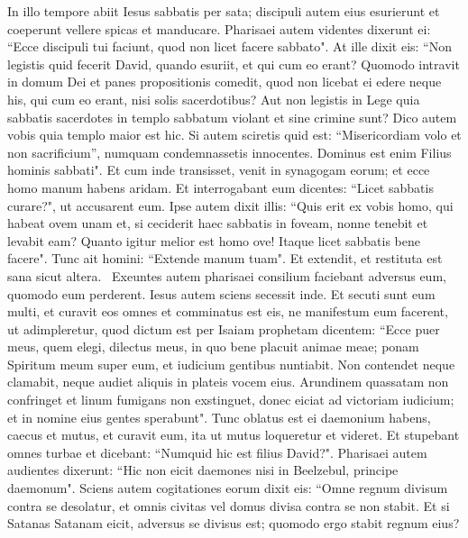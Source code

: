 \begin{biblechapter}  
\verse In illo tempore abiit Iesus sabbatis per sata; discipuli autem eius esurierunt et coeperunt vellere spicas et manducare. 
\verse Pharisaei autem videntes dixerunt ei: “Ecce discipuli tui faciunt, quod non licet facere sabbato". 
\verse At ille dixit eis: “Non legistis quid fecerit David, quando esuriit, et qui cum eo erant? 
\verse Quomodo intravit in domum Dei et panes propositionis comedit, quod non licebat ei edere neque his, qui cum eo erant, nisi solis sacerdotibus? 
\verse Aut non legistis in Lege quia sabbatis sacerdotes in templo sabbatum violant et sine crimine sunt? 
\verse Dico autem vobis quia templo maior est hic.  
\verse Si autem sciretis quid est: “Misericordiam volo et non sacrificium”, numquam condemnassetis innocentes. 
\verse Dominus est enim Filius hominis sabbati". 
\verse Et cum inde transisset, venit in synagogam eorum; 
\verse et ecce homo manum habens aridam. Et interrogabant eum dicentes: “Licet sabbatis curare?", ut accusarent eum. 
\verse Ipse autem dixit illis: “Quis erit ex vobis homo, qui habeat ovem unam et, si ceciderit haec sabbatis in foveam, nonne tenebit et levabit eam? 
\verse Quanto igitur melior est homo ove! Itaque licet sabbatis bene facere". 
\verse Tunc ait homini: “Extende manum tuam". Et extendit, et restituta est sana sicut altera.  
\verse Exeuntes autem pharisaei consilium faciebant adversus eum, quomodo eum perderent. 
\verse Iesus autem sciens secessit inde. Et secuti sunt eum multi, et curavit eos omnes 
\verse et comminatus est eis, ne manifestum eum facerent, 
\verse ut adimpleretur, quod dictum est per Isaiam prophetam dicentem: 
\verse “Ecce puer meus, quem elegi, dilectus meus, in quo bene placuit animae meae; ponam Spiritum meum super eum, et iudicium gentibus nuntiabit. 
\verse Non contendet neque clamabit, neque audiet aliquis in plateis vocem eius. 
\verse Arundinem quassatam non confringet et linum fumigans non exstinguet, donec eiciat ad victoriam iudicium; 
\verse et in nomine eius gentes sperabunt". 
\verse Tunc oblatus est ei daemonium habens, caecus et mutus, et curavit eum, ita ut mutus loqueretur et videret. 
\verse Et stupebant omnes turbae et dicebant: “Numquid hic est filius David?". 
\verse Pharisaei autem audientes dixerunt: “Hic non eicit daemones nisi in Beelzebul, principe daemonum". 
\verse Sciens autem cogitationes eorum dixit eis: “Omne regnum divisum contra se desolatur, et omnis civitas vel domus divisa contra se non stabit. 
\verse Et si Satanas Satanam eicit, adversus se divisus est; quomodo ergo stabit regnum eius? 

\end{biblechapter}
